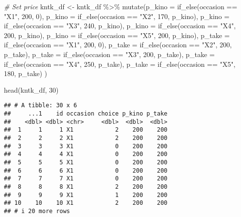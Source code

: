 \documentclass[
]{article}
\newenvironment{Shaded}{\begin{snugshade}}{\end{snugshade}}
\newcommand{\AttributeTok}[1]{\textcolor[rgb]{0.77,0.63,0.00}{#1}}
\newcommand{\CommentTok}[1]{\textcolor[rgb]{0.56,0.35,0.01}{\textit{#1}}}
\newcommand{\DecValTok}[1]{\textcolor[rgb]{0.00,0.00,0.81}{#1}}
\newcommand{\FunctionTok}[1]{\textcolor[rgb]{0.00,0.00,0.00}{#1}}
\newcommand{\NormalTok}[1]{#1}
\newcommand{\OtherTok}[1]{\textcolor[rgb]{0.56,0.35,0.01}{#1}}
\newcommand{\SpecialCharTok}[1]{\textcolor[rgb]{0.00,0.00,0.00}{#1}}
\newcommand{\StringTok}[1]{\textcolor[rgb]{0.31,0.60,0.02}{#1}}
\begin{document}
\begin{Shaded}
\begin{Highlighting}[]
\CommentTok{\# Set price}
\NormalTok{kntk\_df }\OtherTok{\textless{}{-}}\NormalTok{ kntk\_df }\SpecialCharTok{\%\textgreater{}\%}
    \FunctionTok{mutate}\NormalTok{(}\AttributeTok{p\_kino =} \FunctionTok{if\_else}\NormalTok{(occasion }\SpecialCharTok{==} \StringTok{"X1"}\NormalTok{, }\DecValTok{200}\NormalTok{, }\DecValTok{0}\NormalTok{),}
           \AttributeTok{p\_kino =} \FunctionTok{if\_else}\NormalTok{(occasion }\SpecialCharTok{==} \StringTok{"X2"}\NormalTok{, }\DecValTok{170}\NormalTok{, p\_kino),}
           \AttributeTok{p\_kino =} \FunctionTok{if\_else}\NormalTok{(occasion }\SpecialCharTok{==} \StringTok{"X3"}\NormalTok{, }\DecValTok{240}\NormalTok{, p\_kino),}
           \AttributeTok{p\_kino =} \FunctionTok{if\_else}\NormalTok{(occasion }\SpecialCharTok{==} \StringTok{"X4"}\NormalTok{, }\DecValTok{200}\NormalTok{, p\_kino),}
           \AttributeTok{p\_kino =} \FunctionTok{if\_else}\NormalTok{(occasion }\SpecialCharTok{==} \StringTok{"X5"}\NormalTok{, }\DecValTok{200}\NormalTok{, p\_kino),}
           \AttributeTok{p\_take =} \FunctionTok{if\_else}\NormalTok{(occasion }\SpecialCharTok{==} \StringTok{"X1"}\NormalTok{, }\DecValTok{200}\NormalTok{, }\DecValTok{0}\NormalTok{),}
           \AttributeTok{p\_take =} \FunctionTok{if\_else}\NormalTok{(occasion }\SpecialCharTok{==} \StringTok{"X2"}\NormalTok{, }\DecValTok{200}\NormalTok{, p\_take),}
           \AttributeTok{p\_take =} \FunctionTok{if\_else}\NormalTok{(occasion }\SpecialCharTok{==} \StringTok{"X3"}\NormalTok{, }\DecValTok{200}\NormalTok{, p\_take),}
           \AttributeTok{p\_take =} \FunctionTok{if\_else}\NormalTok{(occasion }\SpecialCharTok{==} \StringTok{"X4"}\NormalTok{, }\DecValTok{250}\NormalTok{, p\_take),}
           \AttributeTok{p\_take =} \FunctionTok{if\_else}\NormalTok{(occasion }\SpecialCharTok{==} \StringTok{"X5"}\NormalTok{, }\DecValTok{180}\NormalTok{, p\_take)}
\NormalTok{           )}

\FunctionTok{head}\NormalTok{(kntk\_df, }\DecValTok{30}\NormalTok{)}
\end{Highlighting}
\end{Shaded}

\begin{verbatim}
## # A tibble: 30 x 6
##     ...1    id occasion choice p_kino p_take
##    <dbl> <dbl> <chr>     <dbl>  <dbl>  <dbl>
##  1     1     1 X1            2    200    200
##  2     2     2 X1            2    200    200
##  3     3     3 X1            0    200    200
##  4     4     4 X1            0    200    200
##  5     5     5 X1            0    200    200
##  6     6     6 X1            0    200    200
##  7     7     7 X1            0    200    200
##  8     8     8 X1            2    200    200
##  9     9     9 X1            1    200    200
## 10    10    10 X1            2    200    200
## # i 20 more rows
\end{verbatim}
\end{document}
